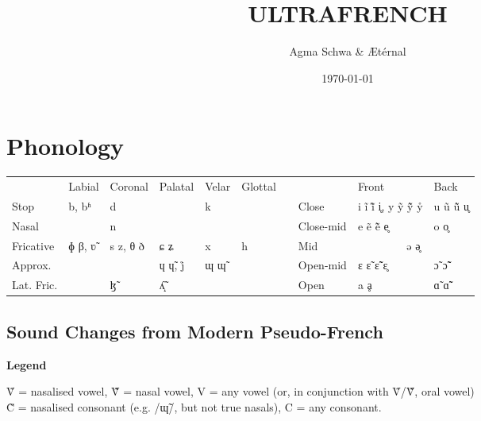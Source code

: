 \documentclass[a4paper, 12pt, oneside, final]{article}
\title{ULTRAFRENCH}
\author{Agma Schwa \& Ætérnal}
\date{\today}
\def\parheading#1{\noindent\textbf{#1}}
\begin{document}
\maketitle
\clearpage

\section{Phonology}\label{sec:phonology}{\def\arraystretch{1.25}\setlength{\tabcolsep}{.4em}
\noindent\begin{tabular}{@{}|l|l|l|l|l|l|l@{\quad}|l|l|l|}                                                   \cline{1-6} \cline{8-10}
               & Labial & Coronal  & Palatal  & Velar & Glottal &&           & Front        & Back        \\ \cline{1-6} \cline{8-10}
    Stop       & b, bʱ  & d        &          & k     &         && Close     & i ĩ ĩ̃ i̥, y ỹ ỹ̃ ẙ & u ũ ũ̃ u̥ \\ \cline{1-6} \cline{8-10}
    Nasal      &        & n        &          &       &         && Close-mid & e ẽ ẽ̃ e̥      & o o̥         \\ \cline{1-6} \cline{8-10}
    Fricative  & ɸ β, ʋ̃ & s z, θ ð & ɕ ʑ      & x     & h       && Mid       & \multicolumn{2}{c|}{ə ə̥}   \\ \cline{1-6} \cline{8-10}
    Approx.    &        &          & ɥ ɥ̃, j̊   & ɰ ɰ̃   &         && Open-mid  & ɛ ɛ̃ ɛ̃̃ ɛ̥      & ɔ̃ ɔ̃̃         \\ \cline{1-6} \cline{8-10}
    Lat. Fric. &        & ɮ̃        & ʎ̝̃        &       &         && Open      & a ḁ          & ɑ̃ ɑ̃̃         \\ \cline{1-6} \cline{8-10}
\end{tabular}}

\subsection{Sound Changes from Modern Pseudo-French}\label{subsec:sound-changes-from-modern-french}
\parheading{Legend}\par\medskip\noindent
Ṽ = nasalised vowel, Ṽ̃ = nasal vowel, V = any vowel (or, in conjunction with Ṽ/Ṽ̃, oral vowel)\\
C̃ = nasalised consonant (e.g. /ɰ̃/, but not true nasals), C = any consonant.\medskip
\end{document}

